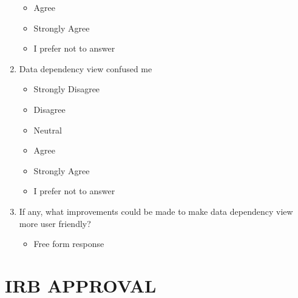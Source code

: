 \begin{enumerate}
\begin{itemize}
        \item Agree
        \item Strongly Agree
        \item I prefer not to answer
    \end{itemize}
    \item Data dependency view confused me
    \begin{itemize}
        \item Strongly Disagree
        \item Disagree
        \item Neutral
        \item Agree
        \item Strongly Agree
        \item I prefer not to answer
    \end{itemize}
    \item If any, what improvements could be made to make data dependency view more user friendly?
    \begin{itemize}
        \item Free form response
    \end{itemize}
\end{enumerate}

\chapter{IRB APPROVAL}
